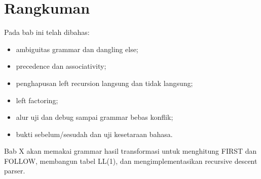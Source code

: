 \section*{Rangkuman}

Pada bab ini telah dibahas:
\begin{itemize}[leftmargin=*]
  \item ambiguitas grammar dan dangling else;
  \item precedence dan associativity;
  \item penghapusan left recursion langsung dan tidak langsung;
  \item left factoring;
  \item alur uji dan debug sampai grammar bebas konflik;
  \item bukti sebelum/sesudah dan uji kesetaraan bahasa.
\end{itemize}

Bab X akan memakai grammar hasil transformasi untuk menghitung
FIRST dan FOLLOW, membangun tabel LL(1), dan mengimplementasikan
recursive descent parser.
